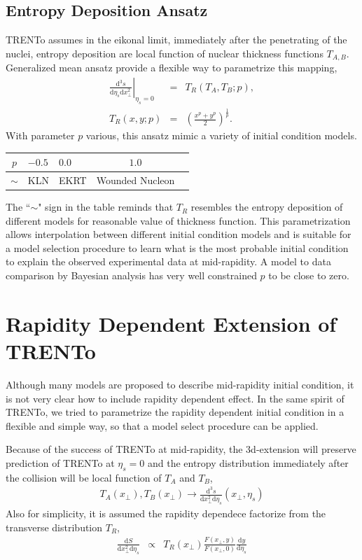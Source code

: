 \documentclass[aps,prl,twocolumn,groupedaddress]{revtex4-1}
\begin{document}
	\subsection{Entropy Deposition Ansatz}
	TRENTo assumes in the eikonal limit, immediately after the penetrating of the nuclei, entropy deposition are local function of nuclear thickness functions $T_{A,B}$. 
	Generalized mean ansatz provide a flexible way to parametrize this mapping,
	\begin{eqnarray}
	\left.\frac{\mathrm{d^3}s}{\mathrm{d}\eta_s \mathrm{d}x_\perp^2}\right\vert_{\eta_s = 0} &=& 	T_R\left(T_A, T_B; p\right),	\\
	T_R(x, y; p) &=& \left(\frac{x^p+y^p}{2}\right)^{\frac{1}{p}}.
	\end{eqnarray}
	With parameter $p$ various, this ansatz mimic a variety of initial condition models.
	\begin{center}
	\begin{tabularx}{0.45\textwidth}{c>{\centering\arraybackslash}m{2.0cm}>{\centering\arraybackslash}m{2cm} cX}
	\toprule[1pt]
	$p$	&	$-0.5$	 	&	$0.0$ 		& 	$1.0$		\\
	\midrule[0.5pt]	
	$\sim$ &		KLN		& 	EKRT		& 		Wounded Nucleon \\
	\bottomrule[1pt]
	\end{tabularx}
	\end{center}
	The ``$\sim$" sign in the table reminds that $T_R$ resembles the entropy deposition of different models for reasonable value of thickness function. 
	This parametrization allows interpolation between different initial condition models and is suitable for a model selection procedure to learn what is the most probable initial condition to explain the observed experimental data at mid-rapidity.
	A model to data comparison by Bayesian analysis has very well constrained $p$ to be close to zero.
\section{Rapidity Dependent Extension of TRENTo}
	Although many models are proposed to describe mid-rapidity initial condition, it is not very clear how to include rapidity dependent effect. In the same spirit of TRENTo, we tried to parametrize the rapidity dependent initial condition in a flexible and simple way, so that a model select procedure can be applied.
	
	Because of the success of TRENTo at mid-rapidity, the 3d-extension will preserve prediction of TRENTo at $\eta_s = 0$ and the entropy distribution immediately after the collision will be local function of $T_A$ and $T_B$,
	\begin{eqnarray}
	T_A(x_\perp), T_B(x_\perp) \rightarrow \frac{\mathrm{d^3}s}{\mathrm{d}x_{\perp}^2 \mathrm{d}\eta_s}\left(x_\perp, \eta_s\right)
	\end{eqnarray}
	Also for simplicity, it is assumed the rapidity dependece factorize from the transverse distribution $T_R$,
	\begin{eqnarray}
		\frac{\mathrm{d}S}{\mathrm{d}x_{\perp}^2 \mathrm{d}\eta_s}  &\propto& T_R(x_\perp) \frac{F(x_\perp,y)}{F(x_\perp,0)}\frac{\mathrm{d}y}{\mathrm{d}\eta_s}
	\end{eqnarray}
	
\end{document}
